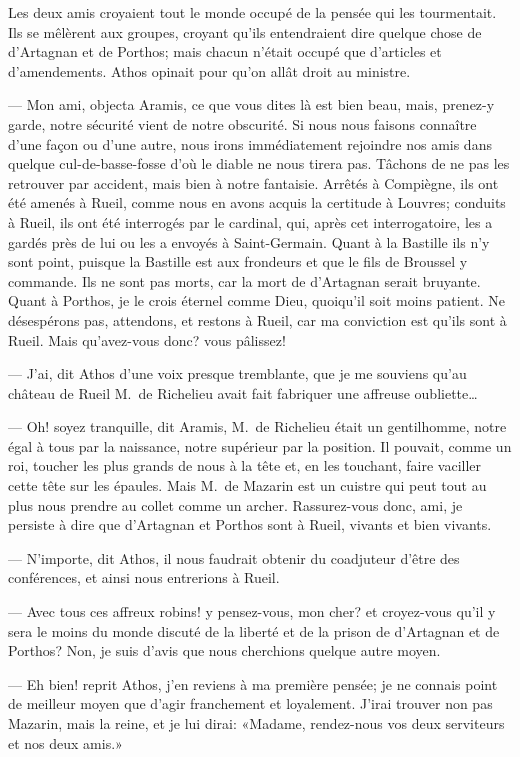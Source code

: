 Les deux amis croyaient tout le monde occupé de la pensée qui les tourmentait. Ils se mêlèrent aux groupes, croyant qu'ils entendraient dire quelque chose de d'Artagnan et de Porthos; mais chacun n'était occupé que d'articles et d'amendements. Athos opinait pour qu'on allât droit au ministre.

— Mon ami, objecta Aramis, ce que vous dites là est bien beau, mais, prenez-y garde, notre sécurité vient de notre obscurité. Si nous nous faisons connaître d'une façon ou d'une autre, nous irons immédiatement rejoindre nos amis dans quelque cul-de-basse-fosse d'où le diable ne nous tirera pas. Tâchons de ne pas les retrouver par accident, mais bien à notre fantaisie. Arrêtés à Compiègne, ils ont été amenés à Rueil, comme nous en avons acquis la certitude à Louvres; conduits à Rueil, ils ont été interrogés par le cardinal, qui, après cet interrogatoire, les a gardés près de lui ou les a envoyés à Saint-Germain. Quant à la Bastille ils n'y sont point, puisque la Bastille est aux frondeurs et que le fils de Broussel y commande. Ils ne sont pas morts, car la mort de d'Artagnan serait bruyante. Quant à Porthos, je le crois éternel comme Dieu, quoiqu'il soit moins patient. Ne désespérons pas, attendons, et restons à Rueil, car ma conviction est qu'ils sont à Rueil. Mais qu'avez-vous donc? vous pâlissez!

— J'ai, dit Athos d'une voix presque tremblante, que je me souviens qu'au château de Rueil M.~de Richelieu avait fait fabriquer une affreuse oubliette\dots

— Oh! soyez tranquille, dit Aramis, M.~de Richelieu était un gentilhomme, notre égal à tous par la naissance, notre supérieur par la position. Il pouvait, comme un roi, toucher les plus grands de nous à la tête et, en les touchant, faire vaciller cette tête sur les épaules. Mais M.~de Mazarin est un cuistre qui peut tout au plus nous prendre au collet comme un archer. Rassurez-vous donc, ami, je persiste à dire que d'Artagnan et Porthos sont à Rueil, vivants et bien vivants.

— N'importe, dit Athos, il nous faudrait obtenir du coadjuteur d'être des conférences, et ainsi nous entrerions à Rueil.

— Avec tous ces affreux robins! y pensez-vous, mon cher? et croyez-vous qu'il y sera le moins du monde discuté de la liberté et de la prison de d'Artagnan et de Porthos? Non, je suis d'avis que nous cherchions quelque autre moyen.

— Eh bien! reprit Athos, j'en reviens à ma première pensée; je ne connais point de meilleur moyen que d'agir franchement et loyalement. J'irai trouver non pas Mazarin, mais la reine, et je lui dirai: «Madame, rendez-nous vos deux serviteurs et nos deux amis.»

